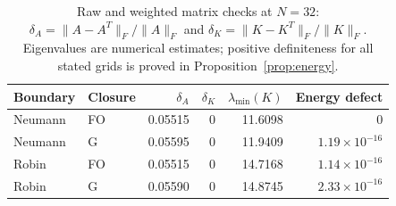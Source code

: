 \begin{table}[htbp]
\centering
\footnotesize
\setlength{\tabcolsep}{4pt}
\begin{tabular}{llrrrr}
\toprule
Boundary & Closure & $\delta_A$ & $\delta_K$ & $\lambda_{\min}(K)$ & Energy defect \\
\midrule
Neumann & FO & 0.05515 & $0$ & 11.6098 & $0$ \\
Neumann & G & 0.05595 & $0$ & 11.9409 & $1.19\times10^{-16}$ \\
Robin & FO & 0.05515 & $0$ & 14.7168 & $1.14\times10^{-16}$ \\
Robin & G & 0.05590 & $0$ & 14.8745 & $2.33\times10^{-16}$ \\
\bottomrule
\end{tabular}
\caption{Raw and weighted matrix checks at $N=32$: $\delta_A=\|A-A^T\|_F/\|A\|_F$ and $\delta_K=\|K-K^T\|_F/\|K\|_F$. Eigenvalues are numerical estimates; positive definiteness for all stated grids is proved in Proposition~\ref{prop:energy}.}
\label{tab:matrix-structure}
\end{table}
